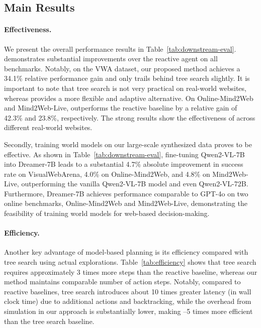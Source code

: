 \subsection{Main Results}


\paragraph{Effectiveness.}
We present the overall performance results in Table~\ref{tab:downstream-eval}. 
\OurMethod demonstrates substantial improvements over the reactive agent on all benchmarks. 
Notably, on the VWA dataset, our proposed method achieves a 34.1\% relative performance gain and only trails behind tree search slightly.
It is important to note that tree search is not very practical on real-world websites, whereas \OurMethod provides a more flexible and adaptive alternative. On Online-Mind2Web and Mind2Web-Live, \OurMethod outperforms the reactive baseline by a relative gain of 42.3\% and 23.8\%, respectively. The strong results show the effectiveness of \OurMethod across different real-world websites.

Secondly, training world models on our large-scale synthesized data proves to be effective.
As shown in Table~\ref{tab:downstream-eval}, fine-tuning Qwen2-VL-7B into Dreamer-7B leads to a substantial 4.7\% absolute improvement in success rate on VisualWebArena, 4.0\% on Online-Mind2Web, and 4.8\% on Mind2Web-Live, outperforming the vanilla Qwen2-VL-7B model and even Qwen2-VL-72B.
Furthermore, Dreamer-7B achieves performance comparable to GPT-4o on two online benchmarks, Online-Mind2Web and Mind2Web-Live, demonstrating the feasibility of training world models for web-based decision-making.

\paragraph{Efficiency.}
Another key advantage of model-based planning is its efficiency compared with tree search using actual explorations.
Table~\ref{tab:efficiency} shows that tree search requires approximately 3 times more steps than the reactive baseline, whereas our method maintains comparable number of action steps.
Notably, compared to reactive baselines, tree search introduces about 10 times greater latency (in wall clock time) due to additional actions and backtracking, while the overhead from simulation in our approach is substantially lower, making --5 times more efficient than the tree search baseline.






